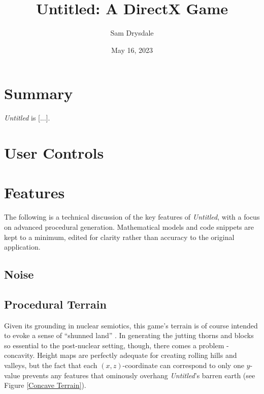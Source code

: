 \documentclass[a4paper, 11pt]{article}
\title{Untitled: A DirectX Game}
\author{Sam Drysdale}
\date{May 16, 2023}
\begin{document}
\graphicspath{{./Images/}}
\maketitle
\tableofcontents
\begin{flushleft}

\section{Summary}

\textit{Untitled} is [...].

\section{User Controls}


\section{Features}\label{Features}

The following is a technical discussion of the key features of \textit{Untitled}, with a focus on advanced procedural generation. Mathematical models and code snippets are kept to a minimum, edited for clarity rather than accuracy to the original application.

\subsection{Noise} %

\subsection{Procedural Terrain} %

Given its grounding in nuclear semiotics, this game's terrain is of course intended to evoke a sense of ``shunned land'' \citep{trth93}. In generating the jutting thorns and blocks so essential to the post-nuclear setting, though, there comes a problem - concavity. Height maps are perfectly adequate for creating rolling hills and valleys, but the fact that each $(x,z)$-coordinate can correspond to only one $y$-value prevents any features that ominously overhang \textit{Untitled}'s barren earth (see Figure \ref{Concave Terrain}).


\end{flushleft}
\end{document}
